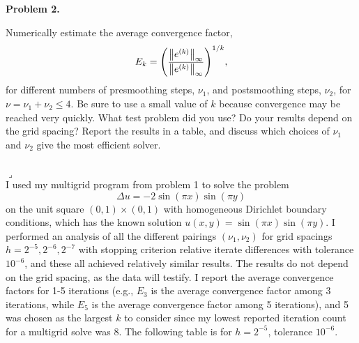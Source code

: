 \documentclass[12pt]{article}
\newenvironment{myprob}[1]
    {%
    \noindent{\Huge$\ulcorner$}\textbf{#1.}\begin{em}
    }
    { 
    \end{em} \\ \hphantom{l} \hfill {\Huge$\lrcorner$} }
\begin{document}
\begin{myprob}{Problem 2}
Numerically estimate the average convergence factor,
$$ E_k = \qty(\dfrac{\norm{e^{(k)}}_\infty}{\norm{e^{(k)}}_\infty})^{1/k},$$
for different numbers of presmoothing steps, $\nu_1$, and postsmoothing steps, $\nu_2$, for $\nu = \nu_1 + \nu_2 \leq 4$. Be sure to use a small value of $k$ because convergence may be reached very quickly. What test problem did you use? Do your results depend on the grid spacing? Report the results in a table, and discuss which choices of $\nu_1$ and $\nu_2$ give the most efficient solver. \\
\end{myprob} \\
I used my multigrid program from problem 1 to solve the problem
$$
\Delta u = -2 \sin(\pi x) \sin(\pi y)
$$
on the unit square $(0, 1)\times(0, 1)$ with homogeneous Dirichlet boundary conditions, which has the known solution $u(x,y) = \sin(\pi x) \sin(\pi y)$.
I performed an analysis of all the different pairings $(\nu_1, \nu_2)$ for grid spacings $h=2^{-5}, 2^{-6}, 2^{-7}$ with stopping criterion relative iterate differences with tolerance $10^{-6}$, and these all achieved relatively similar results. The results do not depend on the grid spacing, as the data will testify. I report the average convergence factors for 1-5 iterations (e.g., $E_3$ is the average convergence factor among 3 iterations, while $E_5$ is the average convergence factor among 5 iterations), and 5 was chosen as the largest $k$ to consider since my lowest reported iteration count for a multigrid solve was 8.  
The following table is for $h=2^{-5}$, tolerance $10^{-6}$.\\
\end{document}
